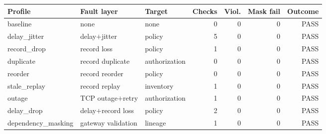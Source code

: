 \begin{tabular}{@{}lllrrrr@{}}
\toprule
Profile & Fault layer & Target & Checks & Viol. & Mask fail & Outcome \\
\midrule
baseline & none & none & 0 & 0 & 0 & PASS \\
delay\_jitter & delay$+$jitter & policy & 5 & 0 & 0 & PASS \\
record\_drop & record loss & policy & 1 & 0 & 0 & PASS \\
duplicate & record duplicate & authorization & 0 & 0 & 0 & PASS \\
reorder & record reorder & policy & 0 & 0 & 0 & PASS \\
stale\_replay & record replay & inventory & 1 & 0 & 0 & PASS \\
outage & TCP outage$+$retry & authorization & 1 & 0 & 0 & PASS \\
delay\_drop & delay$+$record loss & policy & 2 & 0 & 0 & PASS \\
dependency\_masking & gateway validation & lineage & 1 & 0 & 0 & PASS \\
\bottomrule
\end{tabular}

